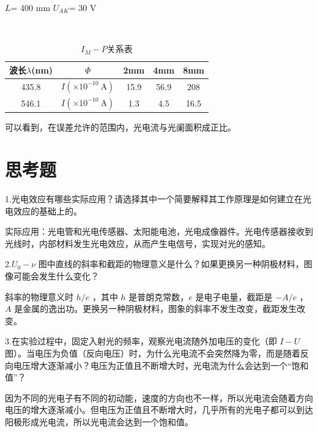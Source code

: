 \documentclass[12pt]{article}
\begin{document}
\begin{table}[H]
    \centering
    \caption{$I_M - P$关系表}
    \vspace{2pt}
    \begin{minipage}{0.9\textwidth}
        \centering
        $L$= 400 mm \hspace{1cm} $U_{AK}$= 30 V
    \end{minipage}\\[2pt]
    \begin{tabular}{c|cccc}
    波长$\lambda$(nm)    & $\Phi$             & 2mm  & 4mm  & 8mm  \\ \hline \hline
    435.8 & $I (\times 10^{-10}\ \mathrm A)$  & 15.9 & 56.9 & 208  \\ \hline
    546.1 & $I (\times 10^{-10}\ \mathrm A)$  &1.3 & 4.5  & 16.5  
    \end{tabular}
\end{table}

可以看到，在误差允许的范围内，光电流与光阑面积成正比。

\section{思考题}
1.光电效应有哪些实际应用？请选择其中一个简要解释其工作原理是如何建立在光电效应的基础上的。

实际应用：光电管和光电传感器、太阳能电池，光电成像器件。光电传感器接收到光线时，内部材料发生光电效应，从而产生电信号，实现对光的感知。

2.$U_0-\nu$ 图中直线的斜率和截距的物理意义是什么？如果更换另一种阴极材料，图像可能会发生什么变化？

斜率的物理意义时 $h/e$ ，其中 $h$ 是普朗克常数，$e$ 是电子电量，截距是 $-A/e$ ， $A$ 是金属的逸出功。更换另一种阴极材料，图象的斜率不发生改变，截距发生改变。 

3.在实验过程中，固定入射光的频率，观察光电流随外加电压的变化（即 $I-U$ 图）。当电压为负值（反向电压）时，为什么光电流不会突然降为零，而是随着反向电压增大逐渐减小？电压为正值且不断增大时，光电流为什么会达到一个“饱和值”？

因为不同的光电子有不同的初动能，速度的方向也不一样，所以光电流会随着方向电压的增大逐渐减小。但电压为正值且不断增大时，几乎所有的光电子都可以到达阳极形成光电流，所以光电流会达到一个饱和值。
\end{document}
